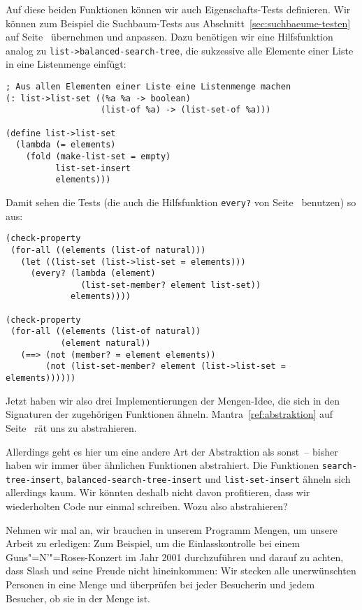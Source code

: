 %
Auf diese beiden Funktionen können wir auch Eigenschafts-Tests
definieren.  Wir können zum Beispiel die Suchbaum-Tests aus
Abschnitt~\ref{sec:suchbaeume-testen} auf
Seite~\pageref{sec:suchbaeume-testen} übernehmen und anpassen.  Dazu
benötigen wir eine Hilfsfunktion analog zu
\lstinline{list->balanced-search-tree}, die sukzessive alle Elemente
einer Liste in eine Listenmenge einfügt:
%
\begin{lstlisting}
; Aus allen Elementen einer Liste eine Listenmenge machen
(: list->list-set ((%a %a -> boolean)
                   (list-of %a) -> (list-set-of %a)))

(define list->list-set
  (lambda (= elements)
    (fold (make-list-set = empty)
          list-set-insert
          elements)))
\end{lstlisting}
%
Damit sehen die Tests (die auch die Hilfsfunktion \lstinline{every?}
von Seite~\pageref{func:everyp} benutzen) so aus:
%
\begin{lstlisting}
(check-property
 (for-all ((elements (list-of natural)))
   (let ((list-set (list->list-set = elements)))
     (every? (lambda (element)
               (list-set-member? element list-set))
             elements))))

(check-property
 (for-all ((elements (list-of natural))
           (element natural))
   (==> (not (member? = element elements))
        (not (list-set-member? element (list->list-set = elements))))))
\end{lstlisting}
%
Jetzt haben wir also drei Implementierungen der Mengen-Idee, die sich
in den Signaturen der zugehörigen Funktionen ähneln.
Mantra~\ref{ref:abstraktion} auf Seite~\pageref{mantra:abstraktion}
rät uns zu abstrahieren.

Allerdings geht es hier um eine andere Art der Abstraktion als
sonst~-- bisher haben wir immer über ähnlichen Funktionen
abstrahiert.  Die Funktionen \lstinline{search-tree-insert},
\lstinline{balanced-search-tree-insert} und \lstinline{list-set-insert}
ähneln sich allerdings kaum.  Wir könnten deshalb nicht davon
profitieren, dass wir wiederholten Code nur einmal schreiben.  Wozu
also abstrahieren?

Nehmen wir mal an, wir brauchen in unserem Programm Mengen, um unsere
Arbeit zu erledigen:  Zum Beispiel, um die Einlasskontrolle bei einem
Guns"=N'"=Roses-Konzert im Jahr 2001 durchzuführen und darauf zu achten,
dass Slash und seine Freude nicht hineinkommen: Wir stecken alle
unerwünschten Personen in eine Menge und überprüfen bei jeder
Besucherin und jedem Besucher, ob sie in der Menge ist.

